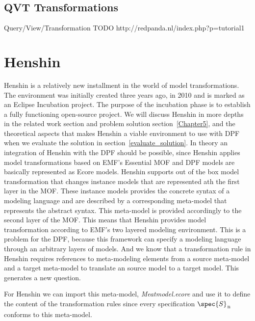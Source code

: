 \subsection{QVT Transformations}
Query/View/Transformation 
TODO
http://redpanda.nl/index.php?p=tutorial1

\section{Henshin}
\label{tool_choice}

Henshin\cite{Henshin_2010,Henshin} is a relatively new installment in the world
of model transformations. The environment was initially created three years
ago, in 2010 and is marked as an Eclipse Incubation project. The purpose of the
incubation phase is to establish a fully functioning open-source project. We
will discuss Henshin in more depths in the related work section and problem
solution section~\ref{Chapter5}, and the theoretical aspects that makes Henshin
a viable environment to use with DPF when we evaluate the solution in
section~\ref{evaluate_solution}. In theory an integration of Henshin with the
DPF should be possible, since Henshin applies model transformations based on
EMF's Essential MOF and DPF models are basically represented as Ecore models.
Henshin supports out of the box model transformation that changes instance
models that are represented ath the first layer in the MOF. These instance
models provides the concrete syntax of a modeling language and are described by
a corresponding meta-model that represents the abstract syntax. This meta-model
is provided accordingly to the second layer of the MOF. This means that Henshin
provides model transformation according to EMF's two layered modeling
environment. This is a problem for the DPF, because this framework can specify a
modeling language through an arbitrary layers of models. And we know that a
transformation rule in Henshin requires references to meta-modeling elements
from a source meta-model and a target meta-model to translate an source model to
a target model. This generates a new question.  

For Henshin we can import this meta-model, \textit{Meatmodel.ecore} and use it
to define the content of the transformation rules since every specification
$\spec{S}$\textsubscript{n} conforms to this meta-model.

